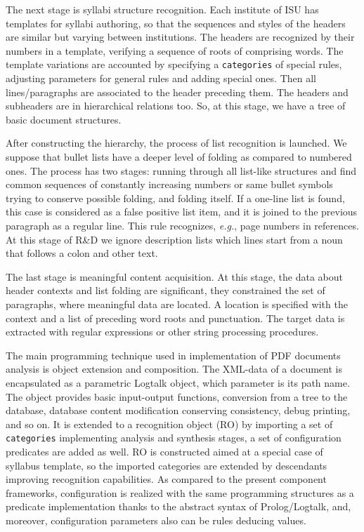 \documentclass[
]{ceurart}
\begin{document}
The next stage is syllabi structure recognition.  Each institute of ISU has templates for syllabi authoring, so that the sequences and styles of the headers are similar but varying between institutions.  The headers are recognized by their numbers in a template, verifying a sequence of roots of comprising words.  The template variations are accounted by specifying a \verb|categories| of special rules, adjusting parameters for general rules and adding special ones.  Then all lines/paragraphs are associated to the header preceding them.  The headers and subheaders are in hierarchical relations too.  So, at this stage, we have a tree of basic document structures.

After constructing the hierarchy, the process of list recognition is launched.  We suppose that bullet lists have a deeper level of folding as compared to numbered ones.  The process has two stages: running through all list-like structures and find common sequences of constantly increasing numbers or same bullet symbols trying to conserve possible folding, and folding itself.  If a one-line list is found, this case is considered as a false positive list item, and it is joined to the previous paragraph as a regular line.  This rule recognizes, \emph{e.g.}, page numbers in references.  At this stage of R\&D we ignore description lists which lines start from a noun that follows a colon and other text.

The last stage is meaningful content acquisition.  At this stage, the data about header contexts and list folding are significant, they constrained the set of paragraphs, where meaningful data are located.  A location is specified with the context and a list of preceding word roots and punctuation. The target data is extracted with regular expressions or other string processing procedures.

The main programming technique used in implementation of PDF documents analysis is object extension and composition.  The XML-data of a document is encapsulated as a parametric Logtalk object, which parameter is its path name.  The object provides basic input-output functions, conversion from a tree to the database, database content modification conserving consistency, debug printing, and so on.  It is extended to a recognition object (RO) by importing a set of \verb|categories| implementing analysis and synthesis stages, a set of configuration predicates are added as well.  RO is constructed aimed at a special case of syllabus template, so the imported categories are extended by descendants improving recognition capabilities.  As compared to the present component frameworks, configuration is realized with the same programming structures as a predicate implementation thanks to the abstract syntax of Prolog/Logtalk, and, moreover, configuration parameters also can be rules deducing values.
\end{document}
